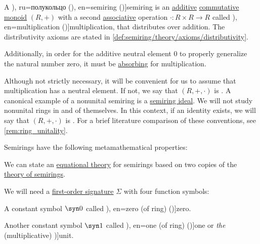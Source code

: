 \begin{definition}\label{def:semiring}\mimprovised
  A \term[ru=полупръстен (\cite[372]{ГеновМиховскиМоллов1991Алгебра}), ru=полукольцо (\cite[def. 3.1]{БелоусовТкачёв2004ДискретнаяМатематика}), en=semiring (\cite[1]{Golan1999Semirings})]{semiring} is an \hyperref[def:additive_semigroup]{additive} \hyperref[def:monoid/commutative]{commutative monoid} \( (R, +) \) with a second \hyperref[def:binary_operation/associative]{associative} operation \( \cdot: R \times R \to R \) called \term[ru=умножение (\cite[def. 3.1]{БелоусовТкачёв2004ДискретнаяМатематика}), en=multiplication (\cite[1]{Golan1999Semirings})]{multiplication}, that distributes over addition. The distributivity axioms are stated in \cref{def:semiring/theory/axioms/distributivity}.

  Additionally, in order for the additive neutral element \( 0 \) to properly generalize the natural number zero, it must be \hyperref[def:semigroup_absorbing_element]{absorbing} for multiplication.

  Although not strictly necessary, it will be convenient for us to assume that multiplication has a neutral element. If not, we say that \( (R, +, \cdot) \) is . A canonical example of a nonunital semiring is a \hyperref[def:semiring_ideal]{semiring ideal}. We will not study nonunital rings in and of themselves. In this context, if an identity exists, we will say that \( (R, +, \cdot) \) is . For a brief literature comparison of these conventions, see \cref{rem:ring_unitality}.

  Semirings have the following metamathematical properties:
  \begin{thmenum}
     We can state an \hyperref[def:fol_equational_theory]{equational theory} for semirings based on two copies of the \hyperref[def:semiring/theory]{theory of semirings}.

    \begin{thmenum}
       We will need a \hyperref[def:fol_signature]{first-order signature} \( \Sigma \) with four function symbols:
      \begin{thmenum}
         A constant symbol \( \syn0 \) called \term[ru=нуль (\cite[def. 3.1]{БелоусовТкачёв2004ДискретнаяМатематика}), en=zero (of ring) (\cite[30]{Rotman2015AdvancedModernAlgebraPart1})]{zero}.

         Another constant symbol \( \syn1 \) called \term[ru=единица (\cite[def. 3.1]{БелоусовТкачёв2004ДискретнаяМатематика}), en=one (of ring) (\cite[30]{Rotman2015AdvancedModernAlgebraPart1})]{one} or \emph{the} (multiplicative) \term[en=unit (of ring) (\cite[30]{Rotman2015AdvancedModernAlgebraPart1})]{unit}.


\end{thmenum}
\end{thmenum}
\end{thmenum}
\end{definition}
